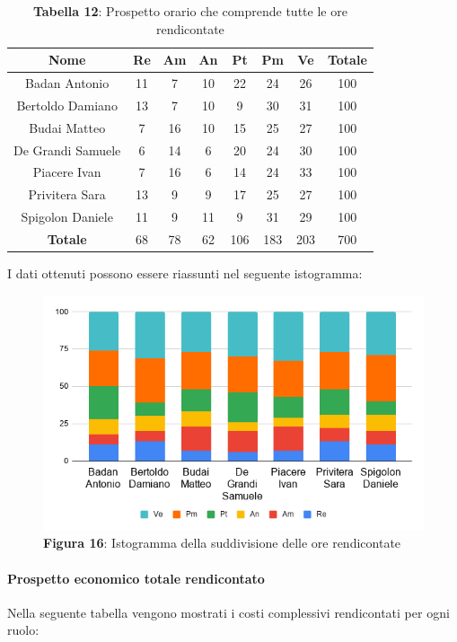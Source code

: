 \begin{table}[H]
	\centering
	\renewcommand{\arraystretch}{1.5}
	\begin{tabular}{|c|c|c|c|c|c|c|c|}
		\hline
		\rowcolor{lighter-grayer}
Nome & Re & Am & An & Pt & Pm & Ve & Totale \\ \hline
Badan Antonio & 11 & 7 & 10 & 22 & 24 & 26 & 100 \\ \hline
Bertoldo Damiano & 13 & 7 & 10 & 9 & 30 & 31 & 100 \\ \hline
Budai Matteo & 7 & 16 & 10 & 15 & 25 & 27 & 100 \\ \hline
De Grandi Samuele & 6 & 14 & 6 & 20 & 24 & 30 & 100 \\ \hline
Piacere Ivan & 7 & 16 & 6 & 14 & 24 & 33 & 100 \\ \hline
Privitera Sara & 13 & 9 & 9 & 17 & 25 & 27 & 100 \\ \hline
Spigolon Daniele & 11 & 9 & 11 & 9 & 31 & 29 & 100 \\ \hline
\textbf{Totale} & 68 & 78 & 62 & 106 & 183 & 203 & 700 \\ \hline
	\end{tabular}
	\caption*{\textbf{Tabella 12}: Prospetto orario che comprende tutte le ore rendicontate\\}
\end{table}	
I dati ottenuti possono essere riassunti nel seguente istogramma:

\begin{figure}[H]
	\centering
	\includegraphics[width=0.7\linewidth]{res/images/IstogrammaTotaleRendicontato.png}
	\caption*{\textbf{Figura 16}: Istogramma della suddivisione delle ore rendicontate}
	\label{fig:Figura10}
\end{figure}

\paragraph{Prospetto economico totale rendicontato}
Nella seguente tabella vengono mostrati i costi complessivi rendicontati per ogni ruolo:

